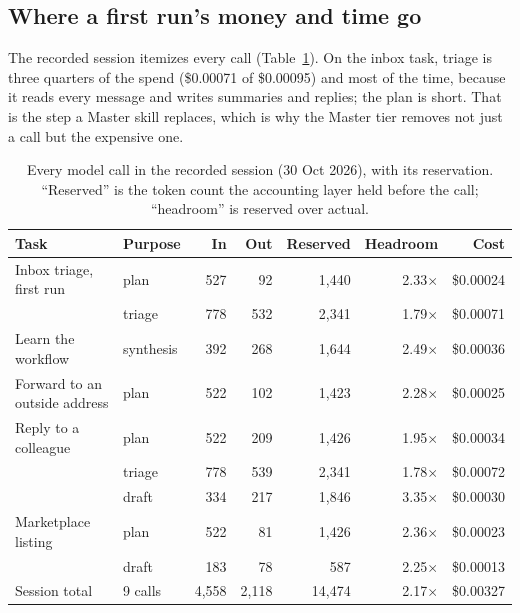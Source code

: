 \documentclass[11pt]{article}
\begin{document}
\subsection{Where a first run's money and time go}

The recorded session itemizes every call (Table~\ref{tab:calls}). On the inbox task, triage is three quarters of the
spend (\$0.00071 of \$0.00095) and most of the time, because it reads every message and writes summaries and replies;
the plan is short. That is the step a Master skill replaces, which is why the Master tier removes not just a call but
the expensive one.

\begin{table}[!htbp]
\centering\small
\caption{Every model call in the recorded session (30 Oct 2026), with its reservation. ``Reserved'' is the
token count the accounting layer held before the call; ``headroom'' is reserved over actual.}
\label{tab:calls}
\begin{tabular}{llrrrrr}
\toprule
Task & Purpose & In & Out & Reserved & Headroom & Cost\\
\midrule
Inbox triage, first run & plan & 527 & 92 & 1{,}440 & 2.33$\times$ & \$0.00024\\
 & triage & 778 & 532 & 2{,}341 & 1.79$\times$ & \$0.00071\\
Learn the workflow & synthesis & 392 & 268 & 1{,}644 & 2.49$\times$ & \$0.00036\\
Forward to an outside address & plan & 522 & 102 & 1{,}423 & 2.28$\times$ & \$0.00025\\
Reply to a colleague & plan & 522 & 209 & 1{,}426 & 1.95$\times$ & \$0.00034\\
 & triage & 778 & 539 & 2{,}341 & 1.78$\times$ & \$0.00072\\
 & draft & 334 & 217 & 1{,}846 & 3.35$\times$ & \$0.00030\\
Marketplace listing & plan & 522 & 81 & 1{,}426 & 2.36$\times$ & \$0.00023\\
 & draft & 183 & 78 & 587 & 2.25$\times$ & \$0.00013\\
\midrule
Session total & 9 calls & 4{,}558 & 2{,}118 & 14{,}474 & 2.17$\times$ & \$0.00327\\
\bottomrule
\end{tabular}
\end{table}
\end{document}
